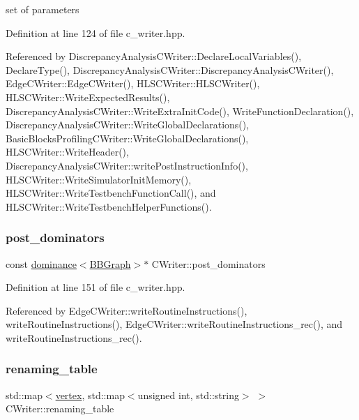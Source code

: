 set of parameters 



Definition at line 124 of file c\+\_\+writer.\+hpp.



Referenced by Discrepancy\+Analysis\+C\+Writer\+::\+Declare\+Local\+Variables(), Declare\+Type(), Discrepancy\+Analysis\+C\+Writer\+::\+Discrepancy\+Analysis\+C\+Writer(), Edge\+C\+Writer\+::\+Edge\+C\+Writer(), H\+L\+S\+C\+Writer\+::\+H\+L\+S\+C\+Writer(), H\+L\+S\+C\+Writer\+::\+Write\+Expected\+Results(), Discrepancy\+Analysis\+C\+Writer\+::\+Write\+Extra\+Init\+Code(), Write\+Function\+Declaration(), Discrepancy\+Analysis\+C\+Writer\+::\+Write\+Global\+Declarations(), Basic\+Blocks\+Profiling\+C\+Writer\+::\+Write\+Global\+Declarations(), H\+L\+S\+C\+Writer\+::\+Write\+Header(), Discrepancy\+Analysis\+C\+Writer\+::write\+Post\+Instruction\+Info(), H\+L\+S\+C\+Writer\+::\+Write\+Simulator\+Init\+Memory(), H\+L\+S\+C\+Writer\+::\+Write\+Testbench\+Function\+Call(), and H\+L\+S\+C\+Writer\+::\+Write\+Testbench\+Helper\+Functions().

\mbox{\label{classCWriter_a40593fe1329f1864c57b777b5fb7e3df}} 
\subsubsection{\texorpdfstring{post\+\_\+dominators}{post\_dominators}}
{\footnotesize\ttfamily const \hyperlink{classdominance}{dominance}$<$\hyperlink{structBBGraph}{B\+B\+Graph}$>$$\ast$ C\+Writer\+::post\+\_\+dominators\hspace{0.3cm}{\ttfamily [protected]}}



Definition at line 151 of file c\+\_\+writer.\+hpp.



Referenced by Edge\+C\+Writer\+::write\+Routine\+Instructions(), write\+Routine\+Instructions(), Edge\+C\+Writer\+::write\+Routine\+Instructions\+\_\+rec(), and write\+Routine\+Instructions\+\_\+rec().

\mbox{\label{classCWriter_a00f3e4355dfcc26f771a853147cf440d}} 
\subsubsection{\texorpdfstring{renaming\+\_\+table}{renaming\_table}}
{\footnotesize\ttfamily std\+::map$<$\hyperlink{graph_8hpp_abefdcf0544e601805af44eca032cca14}{vertex}, std\+::map$<$unsigned int, std\+::string$>$ $>$ C\+Writer\+::renaming\+\_\+table\hspace{0.3cm}{\ttfamily [protected]}}



